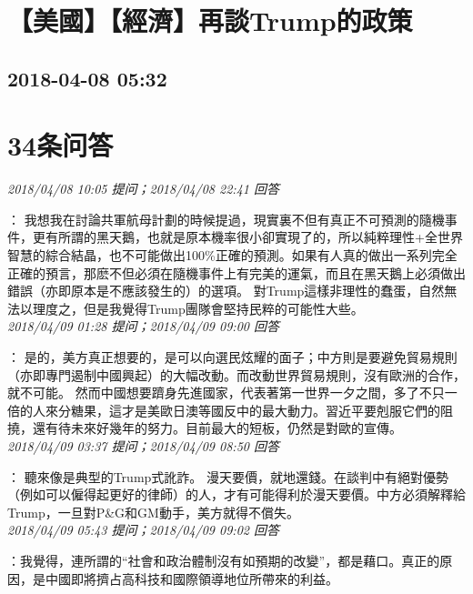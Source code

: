 \documentclass[twocolumn]{ctexart}
\begin{document}
\section{【美國】【經濟】再談Trump的政策}
\subsection{2018-04-08 05:32}


\section{34条问答}

\textit{\hfill\noindent\small 2018/04/08 10:05 提问；2018/04/08 22:41 回答}

：
我想我在討論共軍航母計劃的時候提過，現實裏不但有真正不可預測的隨機事件，更有所謂的黑天鵝，也就是原本機率很小卻實現了的，所以純粹理性+全世界智慧的綜合結晶，也不可能做出100\%正確的預測。如果有人真的做出一系列完全正確的預言，那麽不但必須在隨機事件上有完美的運氣，而且在黑天鵝上必須做出錯誤（亦即原本是不應該發生的）的選項。
對Trump這樣非理性的蠢蛋，自然無法以理度之，但是我覺得Trump團隊會堅持民粹的可能性大些。
\\

\textit{\hfill\noindent\small 2018/04/09 01:28 提问；2018/04/09 09:00 回答}

：
是的，美方真正想要的，是可以向選民炫耀的面子；中方則是要避免貿易規則（亦即專門遏制中國興起）的大幅改動。而改動世界貿易規則，沒有歐洲的合作，就不可能。 
然而中國想要躋身先進國家，代表著第一世界一夕之間，多了不只一倍的人來分糖果，這才是美歐日澳等國反中的最大動力。習近平要剋服它們的阻撓，還有待未來好幾年的努力。目前最大的短板，仍然是對歐的宣傳。
\\

\textit{\hfill\noindent\small 2018/04/09 03:37 提问；2018/04/09 08:50 回答}

：
聽來像是典型的Trump式訛詐。
漫天要價，就地還錢。在談判中有絕對優勢（例如可以僱得起更好的律師）的人，才有可能得利於漫天要價。中方必須解釋給Trump，一旦對P\&G和GM動手，美方就得不償失。
\\

\textit{\hfill\noindent\small 2018/04/09 05:43 提问；2018/04/09 09:02 回答}

：我覺得，連所謂的“社會和政治體制沒有如預期的改變”，都是藉口。真正的原因，是中國即將擠占高科技和國際領導地位所帶來的利益。
\\
\end{document}
